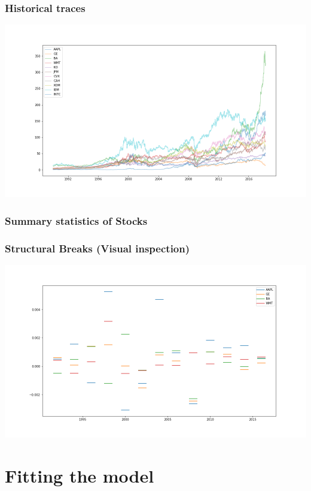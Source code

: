 \documentclass{beamer}
\begin{document}
\begin{frame}
\frametitle{Historical traces}

\centering
\includegraphics[scale=0.32]{../figures/historicaltraces.png}

\end{frame}

\begin{frame}
\frametitle{Summary statistics of Stocks}
\centering
\resizebox{\columnwidth}{!}{%

}

\end{frame}


\begin{frame}
\frametitle{Structural Breaks (Visual inspection)}

\centering
\includegraphics[scale=0.32]{../figures/structural_breaks_means.png}

\end{frame}

\section{Fitting the model}
\end{document}
